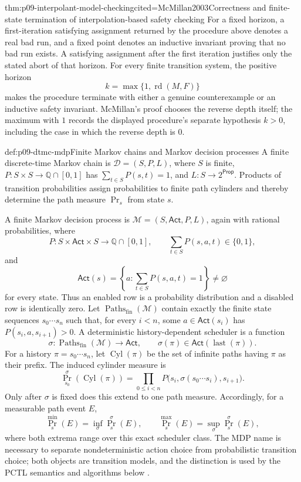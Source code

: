 \begin{hbtheorem}{thm:p09-interpolant-model-checking}{cited=McMillan2003}{Correctness and finite-state termination of interpolation-based safety checking}
For a fixed horizon, a first-iteration satisfying assignment returned by the
procedure above denotes a real bad run, and a fixed point denotes an inductive
invariant proving that no bad run exists.  A satisfying assignment after the
first iteration justifies only the stated abort of that horizon.  For every
finite transition system, the positive horizon
\[
 k=\max\{1,\operatorname{rd}(M,F)\}
\]
makes the procedure terminate with either a genuine counterexample or an
inductive safety invariant.  McMillan's proof chooses the reverse depth itself;
the maximum with \(1\) records the displayed procedure's separate hypothesis
\(k>0\), including the case in which the reverse depth is \(0\).
\end{hbtheorem}

\begin{hbdefinition}{def:p09-dtmc-mdp}{Finite Markov chains and Markov decision processes}
A finite discrete-time Markov chain is
\(\mathcal D=(S,P,L)\), where \(S\) is finite,
\(P:S\times S\to\mathbb Q\cap[0,1]\) has
\(\sum_{t\in S}P(s,t)=1\), and \(L:S\to2^{\mathsf{Prop}}\).  Products of
transition probabilities assign probabilities to finite path cylinders and
thereby determine the path measure \(\Pr_s\) from state \(s\).

A finite Markov decision process is
\(\mathcal M=(S,\mathsf{Act},P,L)\), again with rational probabilities, where
\[
 P:S\times\mathsf{Act}\times S\longrightarrow\mathbb Q\cap[0,1],
 \qquad
 \sum_{t\in S}P(s,a,t)\in\{0,1\},
\]
and
\[
 \mathsf{Act}(s)=
 \left\{a:\sum_{t\in S}P(s,a,t)=1\right\}\ne\varnothing
\]
for every state.  Thus an enabled row is a probability distribution and a
disabled row is identically zero.  Let
\(\operatorname{Paths}_{\mathrm{fin}}(\mathcal M)\) contain exactly the finite
state sequences \(s_0\cdots s_n\) such that, for every \(i<n\), some
\(a\in\mathsf{Act}(s_i)\) has \(P(s_i,a,s_{i+1})>0\).  A deterministic
history-dependent scheduler is a function
\[
 \sigma:\operatorname{Paths}_{\mathrm{fin}}(\mathcal M)\longrightarrow
 \mathsf{Act},
 \qquad
 \sigma(\pi)\in\mathsf{Act}(\operatorname{last}(\pi)).
\]
For a history \(\pi=s_0\cdots s_n\), let
\(\operatorname{Cyl}(\pi)\) be the set of infinite paths having \(\pi\) as
their prefix.  The induced cylinder measure is
\[
 \Pr_{s_0}^{\sigma}(\operatorname{Cyl}(\pi))
   =\prod_{0\leq i<n}
     P\bigl(s_i,\sigma(s_0\cdots s_i),s_{i+1}\bigr).
\]
Only after \(\sigma\) is fixed does this extend to one path measure.
Accordingly, for a measurable path event \(E\),
\[
 \Pr_s^{\min}(E)=\inf_\sigma\Pr_s^\sigma(E),
 \qquad
 \Pr_s^{\max}(E)=\sup_\sigma\Pr_s^\sigma(E),
\]
where both extrema range over this exact scheduler class.  The MDP name is
necessary to separate nondeterministic action choice from probabilistic
transition choice; both objects are transition models, and the distinction is
used by the PCTL semantics and algorithms below \cite{BaierKatoen2008}.
\end{hbdefinition}

